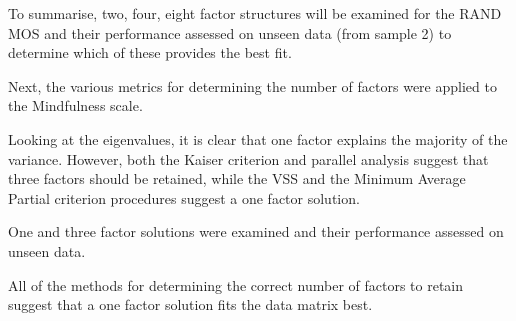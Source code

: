 \documentclass{article}
\begin{document}








To summarise, two, four, eight  factor structures will be examined for the RAND MOS and their performance assessed on unseen data (from sample 2) to determine which of these provides the best fit. 

Next, the various metrics for determining the number of factors were applied to the Mindfulness scale. 




Looking at the eigenvalues, it is clear that one factor explains the majority of the variance. However, both the Kaiser criterion and parallel analysis suggest that three factors should be retained, while the VSS and the Minimum Average Partial criterion procedures suggest a one factor solution.









One and three  factor solutions were examined and their performance assessed on unseen data. 





All of the methods for determining the correct number of factors to retain suggest that a one factor solution fits the data matrix best. 




\end{document}
